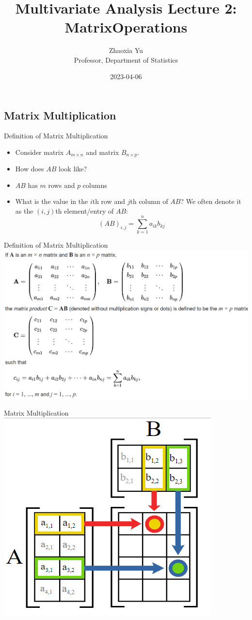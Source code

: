 \documentclass[
  ignorenonframetext,
]{beamer}
\title{Multivariate Analysis Lecture 2: MatrixOperations}
\author{Zhaoxia Yu\\
Professor, Department of Statistics}
\date{2023-04-06}
\providecommand{\tightlist}{%
  \setlength{\itemsep}{0pt}\setlength{\parskip}{0pt}}
\begin{document}
\frame{\titlepage}

\hypertarget{matrix-multiplication}{%
\subsection{Matrix Multiplication}\label{matrix-multiplication}}

\begin{frame}{Definition of Matrix Multiplication}
\protect\hypertarget{definition-of-matrix-multiplication}{}
\begin{itemize}
\tightlist
\item
  Consider matrix \(A_{m\times n}\) and matrix \(B_{n\times p}\).
\item
  How does \(AB\) look like?
\item
  \(AB\) has \(m\) rows and \(p\) columns
\item
  What is the value in the \(i\)th row and \(j\)th column of \(AB\)? We
  often denote it as the \((i,j)\)th element/entry of \(AB\):
  \[\left(AB\right)_{i,j}=\sum_{k=1}^n a_{ik}b_{kj}\]
\end{itemize}
\end{frame}

\begin{frame}{Definition of Matrix Multiplication}
\protect\hypertarget{definition-of-matrix-multiplication-1}{}
\includegraphics[width=0.9\linewidth]{img/MatrixMultiplicationWiki}
\end{frame}

\begin{frame}{Matrix Multiplication}
\protect\hypertarget{matrix-multiplication-1}{}
\includegraphics[width=0.5\linewidth]{img/MatrixMultiplication}
\end{frame}
\end{document}
